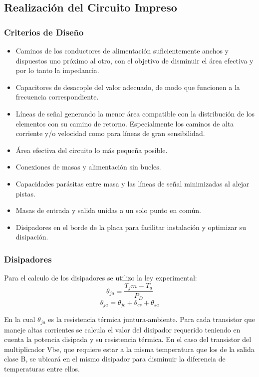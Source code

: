 \subsection{Realización del Circuito Impreso}
\bigskip 
\subsubsection{Criterios de Diseño}

\begin{itemize}
\bigskip 

\item  Caminos de los conductores de alimentación suficientemente anchos y  dispuestos uno próximo al otro, con el objetivo de disminuir el área efectiva y por lo tanto la impedancia.

\item Capacitores de desacople del valor adecuado, de modo que funcionen a la frecuencia correspondiente.

\item Líneas de señal generando la menor área compatible con la distribución de los elementos con su camino de retorno. Especialmente los caminos de alta corriente y/o velocidad como para líneas de gran sensibilidad.

\item Área efectiva del circuito lo más pequeña posible.

\item Conexiones de masas y alimentación sin bucles.

\item Capacidades parásitas entre masa y las líneas de señal minimizadas al alejar pistas.

\item Masas de entrada y salida unidas a un solo punto en común.

\item Disipadores en el borde de la placa para facilitar instalación y optimizar su disipación.

\end{itemize}
\subsubsection{Disipadores}
\bigskip
Para el calculo de los disipadores se utilizo la ley experimental:
$$
   \theta_{ja}=\dfrac{T_jm-T_a}{P_D}
$$
$$
	\theta_{ja}=\theta_{jc}+\theta_{cs}+\theta_{sa}
$$

En la cual $\theta_{ja}$ es la resistencia térmica juntura-ambiente. Para cada transistor que maneje altas corrientes se calcula el valor del disipador requerido teniendo en cuenta la potencia disipada y su resistencia térmica. En el caso del transistor del multiplicador Vbe, que requiere estar a la misma temperatura que los de la salida clase B, se ubicará en el mismo disipador para disminuir la diferencia de temperaturas entre ellos.

